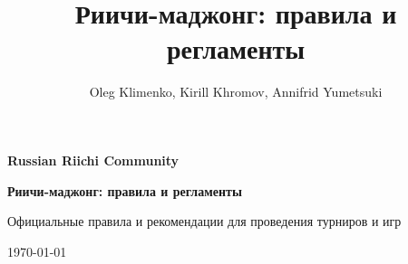 \documentclass[16pt, a4paper]{article}
\author{Oleg Klimenko, Kirill Khromov, Annifrid Yumetsuki}
\title{Риичи-маджонг: правила и регламенты}
\begin{document}
	\setlength\parindent{15pt}
	\pagestyle{empty}
	\begin{center}
		\LARGE
		{\bfseries Russian Riichi Community\par}
		\vspace{4cm}
		{\huge\bfseries Риичи-маджонг: правила и регламенты\par}
		\vspace{3cm}
		\par
		
		\normalsize
		Официальные правила и рекомендации для проведения турниров и игр\par
		\vfill
		\today
	\end{center}
	\newpage
	
	\tableofcontents
	\newpage
	
	\pagestyle{plain}
	
	
	
	\newpage
	
	\newpage
	
	\newpage
	
	\newpage
	
	
\end{document}

